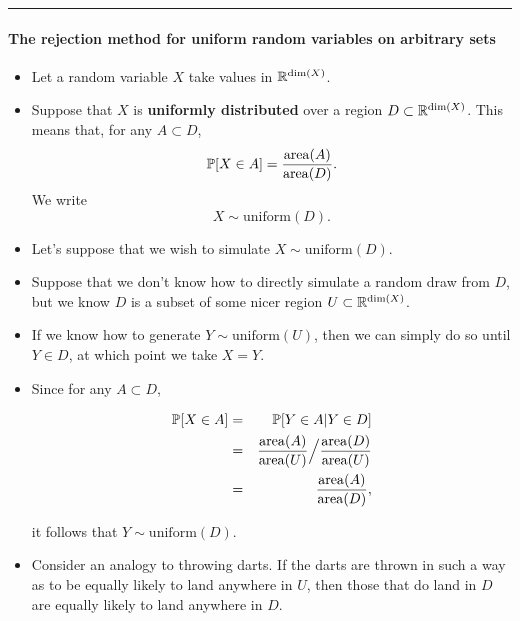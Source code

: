 \documentclass[]{article}
\let\oldparagraph\paragraph
\renewcommand{\paragraph}[1]{\oldparagraph{#1}\mbox{}}
\begin{document}
\begin{center}\rule{0.5\linewidth}{\linethickness}\end{center}

\paragraph{The rejection method for uniform random variables on
arbitrary
sets}\label{the-rejection-method-for-uniform-random-variables-on-arbitrary-sets}

\begin{itemize}
\item
  Let a random variable \(X\) take values in \(\mathbb{R}^{\mathrm{dim}(X)}\).
\item
  Suppose that \(X\) is \textbf{uniformly distributed} over a region
  \(D\subset \mathbb{R}^{\mathrm{dim}(X)}\). This means that, for any \({A}\subset{D}\),
  \[\mathbb{P}[X\in{A]}=\frac{\mathrm{area}(A)}{\mathrm{area}(D)}.\] We write
  \[X \sim \mathrm{uniform}(D).\]
\item
  Let's suppose that we wish to simulate
  \(X\!\sim\!\mathrm{uniform}(D)\).
\item
  Suppose that we don't know how to directly simulate a random draw from
  \(D\), but we know \(D\) is a subset of some nicer region
  \(U\subset \mathbb{R}^{\mathrm{dim}(X)}\).
\item
  If we know how to generate \(Y\!\sim\!\mathrm{uniform}(U)\), then we
  can simply do so until \({Y}\in{D}\), at which point we take \(X=Y\).
\item
  Since for any \(A\subset{D}\),

  \begin{eqnarray}
  \mathbb{P}[X\in A] &=& \mathbb{P}[Y\in A |Y\in D]
  \\ 
  &=& \frac{\mathrm{area}(A)}{\mathrm{area}(U)}\Big{/}\frac{\mathrm{area}(D)}{\mathrm{area}(U)} 
  \\
  &=& \frac{\mathrm{area}(A)}{\mathrm{area}(D)},
  \end{eqnarray}

  it follows that \(Y\!\sim\!\mathrm{uniform}(D)\).
\item
  Consider an analogy to throwing darts. If the darts are thrown in such
  a way as to be equally likely to land anywhere in \(U\), then those
  that do land in \(D\) are equally likely to land anywhere in \(D\).
\end{itemize}
\end{document}
